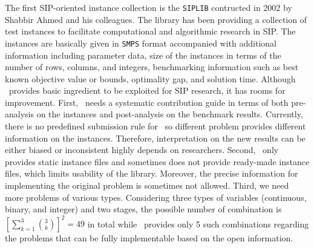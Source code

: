 The first SIP-oriented instance collection is the \texttt{SIPLIB} \cite{web:SIPLIB1} contructed in 2002 by Shabbir Ahmed and his colleagues. The library has been providing a collection of test instances to facilitate computational and algorithmic research in SIP. The instances are basically given in \texttt{SMPS} format accompanied with additional information including parameter data, size of the instances in terms of the number of rows, columns, and integers, benchmarking information such as best known objective value or bounds, optimality gap, and solution time. Although \siplib\ provides basic ingredient to be exploited for SIP research, it has rooms for improvement. First, \siplib\ needs a systematic contribution guide in terms of both pre-analysis on the instances and post-analysis on the benchmark results. Currently, there is no predefined submission rule for \siplib\ so different problem provides different information on the instances. Therefore, interpretation on the new results can be either biased or inconsistent highly depends on researchers. Second, \siplib\ only provides static instance files and sometimes does not provide ready-made instance files, which limits usability of the library. Moreover, the precise information for implementing the original problem is sometimes not allowed. Third, we need more problems of various types. Considering three types of variables (continuous, binary, and integer) and two stages, the possible number of combination is $\left[\sum_{k=1}^3\binom{3}{k}\right]^2=49$ in total while \siplib\ provides only 5 such combinations regarding the problems that can be fully implementable based on the open information.







